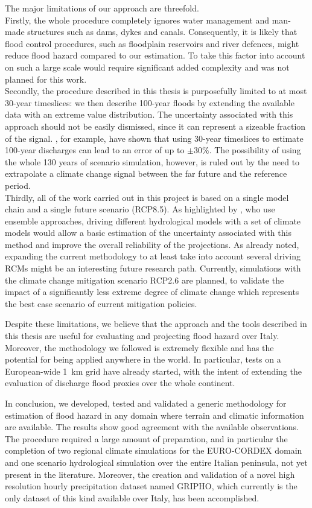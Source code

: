 The major limitations of our approach are threefold.\\
Firstly, the whole procedure completely ignores water management and man-made structures such as dams, dykes and canals.
Consequently, it is likely that flood control procedures, such as floodplain reservoirs and river defences, might reduce flood hazard compared to our estimation.
To take this factor into account on such a large scale would require significant added complexity and was not planned for this work.\\
Secondly, the procedure described in this thesis is purposefully limited to at most 30-year timeslices: we then describe 100-year floods by extending the available data with an extreme value distribution.
The uncertainty associated with this approach should not be easily dismissed, since it can represent a sizeable fraction of the signal. \citet{Schulz2016}, for example, have shown that using 30-year timeslices to estimate 100-year discharges can lead to an error of up to $\pm 30\%$.
The possibility of using the whole 130 years of scenario simulation, however, is ruled out by the need to extrapolate a climate change signal between the far future and the reference period.\\
Thirdly, all of the work carried out in this project is based on a single model chain and a single future scenario (RCP8.5).
As highlighted by \citet{Rojas2012,Dankers2009}, who use ensemble approaches, driving different hydrological models with a set of climate models would allow a basic estimation of the uncertainty associated with this method and improve the overall reliability of the projections.
As already noted, expanding the current methodology to at least take into account several driving RCMs might be an interesting future research path.
Currently, simulations with the climate change mitigation scenario RCP2.6 are planned, to validate the impact of a significantly less extreme degree of climate change which represents the best case scenario of current mitigation policies.

Despite these limitations, we believe that the approach and the tools described in this thesis are useful for evaluating and projecting flood hazard over Italy.
Moreover, the methodology we followed is extremely flexible and has the potential for being applied anywhere in the world.
In particular, tests on a European-wide \SI{1}{\kilo\meter} grid have already started, with the intent of extending the evaluation of discharge flood proxies over the whole continent.

In conclusion, we developed, tested and validated a generic methodology for estimation of flood hazard in any domain where terrain and climatic information are available. The results show good agreement with the available observations.
The procedure required a large amount of preparation, and in particular the completion of two regional climate simulations for the EURO-CORDEX domain and one scenario hydrological simulation over the entire Italian peninsula, not yet present in the literature.
Moreover, the creation and validation of a novel high resolution hourly precipitation dataset named GRIPHO, which currently is the only dataset of this kind available over Italy, has been accomplished.

